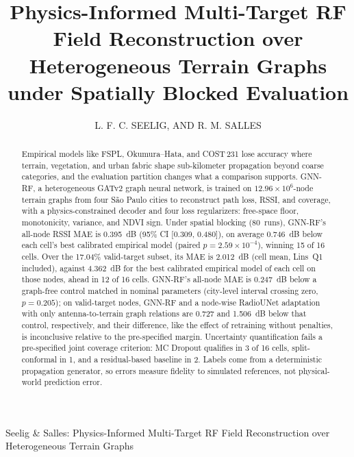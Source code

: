 \documentclass{ieeeaccess}
\begin{document}

\title{Physics-Informed Multi-Target RF Field Reconstruction over Heterogeneous Terrain Graphs under Spatially Blocked Evaluation}

\author{
\uppercase{L. F. C. Seelig},
\uppercase{and R. M. Salles}}

\address[1]{Postgraduate Program in Defense Engineering (PGED), Military Institute of Engineering (IME), Rio de Janeiro, Brazil. 
}
\address[2]{Military Science Laboratory, Brazilian Army Command and General Staff College (ECEME), Brazil (e-mail: seelig.felipe@eb.mil.br)}
\address[3]{Center for Innovation and Research in Business Sciences and Information Systems (CIICESI), ESTG, Polytechnic of Porto, Portugal (e-mail: rmo@estg.ipp.pt)}



{Seelig \& Salles: Physics-Informed Multi-Target RF Field Reconstruction over Heterogeneous Terrain Graphs}



\begin{abstract}
Empirical models like FSPL, Okumura--Hata, and COST\,231 lose accuracy where terrain, vegetation, and urban fabric shape sub-kilometer propagation beyond coarse categories, and the evaluation partition changes what a comparison supports. GNN-RF, a heterogeneous GATv2 graph neural network, is trained on $12.96 \times 10^6$-node terrain graphs from four S\~{a}o Paulo cities to reconstruct path loss, RSSI, and coverage, with a physics-constrained decoder and four loss regularizers: free-space floor, monotonicity, variance, and NDVI sign. Under spatial blocking (80~runs), GNN-RF's all-node RSSI MAE is \SI{0.395}{\deci\bel} (95\% CI [\num{0.309}, \num{0.480}]), on average \SI{0.746}{\deci\bel} below each cell's best calibrated empirical model (paired $p{=}2.59\times10^{-4}$), winning 15 of 16 cells. Over the 17.04\% valid-target subset, its MAE is \SI{2.012}{\deci\bel} (cell mean, Lins~Q1 included), against \SI{4.362}{\deci\bel} for the best calibrated empirical model of each cell on those nodes, ahead in 12 of 16 cells. GNN-RF's all-node MAE is \SI{0.247}{\deci\bel} below a graph-free control matched in nominal parameters (city-level interval crossing zero, $p{=}0.205$); on valid-target nodes, GNN-RF and a node-wise RadioUNet adaptation with only antenna-to-terrain graph relations are 0.727 and \SI{1.506}{\deci\bel} below that control, respectively, and their difference, like the effect of retraining without penalties, is inconclusive relative to the pre-specified margin. Uncertainty quantification fails a pre-specified joint coverage criterion: MC Dropout qualifies in 3 of 16 cells, split-conformal in 1, and a residual-based baseline in 2. Labels come from a deterministic propagation generator, so errors measure fidelity to simulated references, not physical-world prediction error.
\end{abstract}
\end{document}
